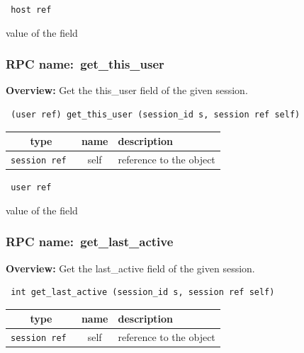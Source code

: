\vspace{0.3cm}

{\tt 
host ref
}


value of the field
\vspace{0.3cm}
\vspace{0.3cm}
\vspace{0.3cm}
\subsubsection{RPC name:~get\_this\_user}

{\bf Overview:} 
Get the this\_user field of the given session.

\begin{verbatim} (user ref) get_this_user (session_id s, session ref self)\end{verbatim}



 
\vspace{0.3cm}
\begin{tabular}{|c|c|p{7cm}|}
 \hline
{\bf type} & {\bf name} & {\bf description} \\ \hline
{\tt session ref } & self & reference to the object \\ \hline 

\end{tabular}

\vspace{0.3cm}

{\tt 
user ref
}


value of the field
\vspace{0.3cm}
\vspace{0.3cm}
\vspace{0.3cm}
\subsubsection{RPC name:~get\_last\_active}

{\bf Overview:} 
Get the last\_active field of the given session.

\begin{verbatim} int get_last_active (session_id s, session ref self)\end{verbatim}



 
\vspace{0.3cm}
\begin{tabular}{|c|c|p{7cm}|}
 \hline
{\bf type} & {\bf name} & {\bf description} \\ \hline
{\tt session ref } & self & reference to the object \\ \hline 

\end{tabular}

